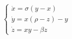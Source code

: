 \documentclass[preview]{standalone}
\begin{document}
\begin{align*}
\begin{cases} \dot{x} = \sigma(y-x) \\ \dot{y} = x(\rho - z) - y \\ \dot{z} = xy - \beta z \end{cases}
\end{align*}
\end{document}
